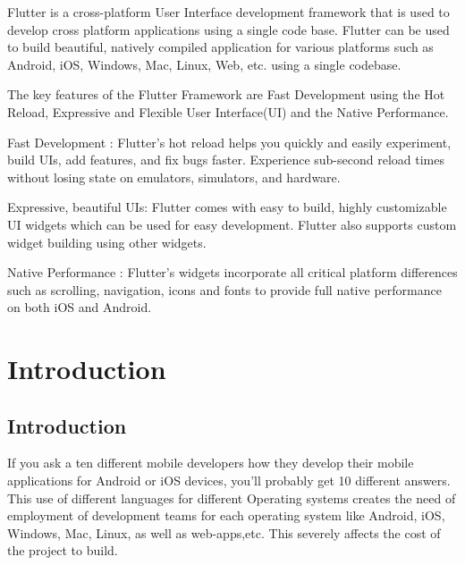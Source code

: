 \documentclass[11pt,a4paper,oneside,openright]{report}
\begin{document}
{{ \hspace{0.2in}Flutter is a cross-platform User Interface development framework that is used to develop cross platform applications using a single code base. Flutter can be used to build beautiful, natively compiled application for various platforms such as Android, iOS, Windows, Mac, Linux, Web, etc. using a single codebase. 

 \hspace{0.2in}The key features of the Flutter Framework are Fast Development using the Hot Reload, Expressive and Flexible User Interface(UI) and the Native Performance.

\hspace{0.2in}Fast Development : Flutter's hot reload helps you quickly and easily experiment, build UIs, add features, and fix bugs faster. Experience sub-second reload times without losing state on emulators, simulators, and hardware.

\hspace{0.2in} Expressive, beautiful UIs: Flutter comes with easy to build, highly customizable UI widgets which can be used for easy development. Flutter also supports custom widget building using other widgets.

\hspace{0.2in} Native Performance : Flutter’s widgets incorporate all critical platform differences such as scrolling, navigation, icons and fonts to provide full native performance on both iOS and Android. 

\newpage
{} %
\tableofcontents
\newpage



\chapter{Introduction}
\label{chap:intro}

\section{Introduction}
\hspace{0.2in} If you ask a ten different mobile developers how they develop their mobile applications for Android or iOS devices, you'll probably get 10 different answers. This use of different languages for different Operating systems creates the need of employment of development teams for each operating system like Android, iOS, Windows, Mac, Linux, as well as web-apps,etc. This severely affects the cost of the project to build. 
				
}}
\end{document}
